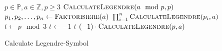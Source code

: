 \documentclass{article}
\newcommand{\tikzmark}[1]{\tikz[overlay,remember picture] \node (#1) {};}
\newcommand*{\AddNote}[4]{%
    \begin{tikzpicture}[overlay, remember picture]
        \draw [decoration={brace,amplitude=0.5em},decorate,very thick]
            ($(#3)!(#1.north)!($(#3)-(0,1)$)$) --  
            ($(#3)!(#2.south)!($(#3)-(0,1)$)$)
                node [align=center, text width=2.5cm, pos=0.5, anchor=west] {#4};
    \end{tikzpicture}
}%
\begin{document}
\begin{preview}
    \begin{algorithm}[H]
        \begin{algorithmic}
            \Require $p \in \mathbb{P}, a \in \mathbb{Z}, p \geq 3$
				\State \Return $\Call{CalculateLegendre}{a \mod p, p}$ 
			 
				\State {}
			 
				\State {}
			 
					\State {}
				\Else
					\State {}
				\EndIf
			 
				\State $p_1, p_2, \dots, p_n \gets \Call{Faktorisiere}{a}$
				\State \Return $\prod_{i=1}^n \Call{CalculateLegendre}{p_i, a}$ 
			 
					\State {}
				\Else
					\State {}
				\EndIf	{}
			 
				\State $t \gets p \mod 3$
					\State $t \gets -1$
				\EndIf
				\State \Return $t$
			\Else
				\State \Return $(-1) \cdot \Call{CalculateLegendre}{p, a}$
			\EndIf
        \end{algorithmic}
    \caption{Calculate Legendre-Symbol}
    \label{alg:euclidBaseTransformation}
    \end{algorithm}
\end{preview}
\end{document}
